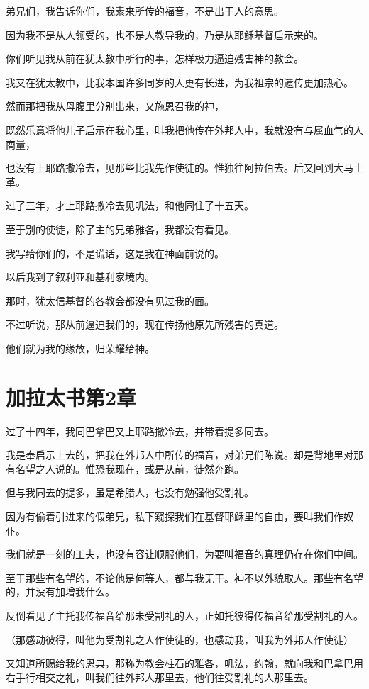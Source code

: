 \documentclass[12pt,oneside]{book}
\begin{document}
弟兄们，我告诉你们，我素来所传的福音，不是出于人的意思。

因为我不是从人领受的，也不是人教导我的，乃是从耶稣基督启示来的。

你们听见我从前在犹太教中所行的事，怎样极力逼迫残害神的教会。

我又在犹太教中，比我本国许多同岁的人更有长进，为我祖宗的遗传更加热心。

然而那把我从母腹里分别出来，又施恩召我的神，

既然乐意将他儿子启示在我心里，叫我把他传在外邦人中，我就没有与属血气的人商量，

也没有上耶路撒冷去，见那些比我先作使徒的。惟独往阿拉伯去。后又回到大马士革。

过了三年，才上耶路撒冷去见叽法，和他同住了十五天。

至于别的使徒，除了主的兄弟雅各，我都没有看见。

我写给你们的，不是谎话，这是我在神面前说的。

以后我到了叙利亚和基利家境内。

那时，犹太信基督的各教会都没有见过我的面。

不过听说，那从前逼迫我们的，现在传扬他原先所残害的真道。

他们就为我的缘故，归荣耀给神。

\chapter{加拉太书第2章}
过了十四年，我同巴拿巴又上耶路撒冷去，并带着提多同去。

我是奉启示上去的，把我在外邦人中所传的福音，对弟兄们陈说。却是背地里对那有名望之人说的。惟恐我现在，或是从前，徒然奔跑。

但与我同去的提多，虽是希腊人，也没有勉强他受割礼。

因为有偷着引进来的假弟兄，私下窥探我们在基督耶稣里的自由，要叫我们作奴仆。

我们就是一刻的工夫，也没有容让顺服他们，为要叫福音的真理仍存在你们中间。

至于那些有名望的，不论他是何等人，都与我无干。神不以外貌取人。那些有名望的，并没有加增我什么。

反倒看见了主托我传福音给那未受割礼的人，正如托彼得传福音给那受割礼的人。

（那感动彼得，叫他为受割礼之人作使徒的，也感动我，叫我为外邦人作使徒）

又知道所赐给我的恩典，那称为教会柱石的雅各，叽法，约翰，就向我和巴拿巴用右手行相交之礼，叫我们往外邦人那里去，他们往受割礼的人那里去。
\end{document}
